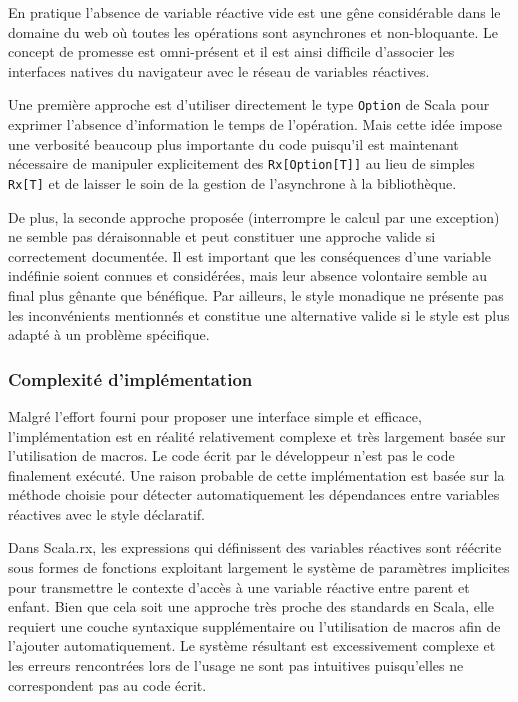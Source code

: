 En pratique l'absence de variable réactive vide est une gêne considérable dans le domaine du web où toutes les opérations sont asynchrones et non-bloquante. Le concept de promesse est omni-présent et il est ainsi difficile d'associer les interfaces natives du navigateur avec le réseau de variables réactives.

Une première approche est d'utiliser directement le type \texttt{Option} de Scala pour exprimer l'absence d'information le temps de l'opération. Mais cette idée impose une verbosité beaucoup plus importante du code puisqu'il est maintenant nécessaire de manipuler explicitement des \texttt{Rx[Option[T]]} au lieu de simples \texttt{Rx[T]} et de laisser le soin de la gestion de l'asynchrone à la bibliothèque.

De plus, la seconde approche proposée (interrompre le calcul par une exception) ne semble pas déraisonnable et peut constituer une approche valide si correctement documentée. Il est important que les conséquences d'une variable indéfinie soient connues et considérées, mais leur absence volontaire semble au final plus gênante que bénéfique. Par ailleurs, le style monadique ne présente pas les inconvénients mentionnés et constitue une alternative valide si le style est plus adapté à un problème spécifique.

\subsubsection{Complexité d'implémentation}

Malgré l'effort fourni pour proposer une interface simple et efficace, l'implémentation est en réalité relativement complexe et très largement basée sur l'utilisation de macros. Le code écrit par le développeur n'est pas le code finalement exécuté. Une raison probable de cette implémentation est basée sur la méthode choisie pour détecter automatiquement les dépendances entre variables réactives avec le style déclaratif.

Dans Scala.rx, les expressions qui définissent des variables réactives sont réécrite sous formes de fonctions exploitant largement le système de paramètres implicites pour transmettre le contexte d'accès à une variable réactive entre parent et enfant. Bien que cela soit une approche très proche des standards en Scala, elle requiert une couche syntaxique supplémentaire ou l'utilisation de macros afin de l'ajouter automatiquement. Le système résultant est excessivement complexe et les erreurs rencontrées lors de l'usage ne sont pas intuitives puisqu'elles ne correspondent pas au code écrit. 

